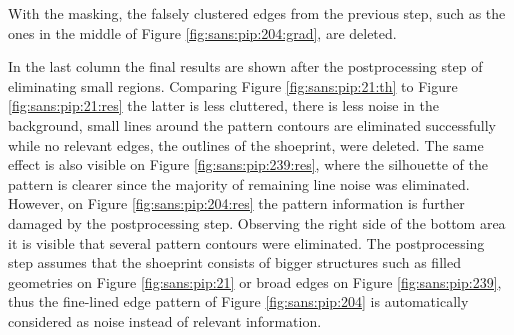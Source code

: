 \documentclass[draft,final]{vutinfth} %
\begin{document}
With the masking, the falsely clustered edges from the previous step, such as the ones in the middle of Figure \ref{fig:sans:pip:204:grad}, are deleted.
\par
In the last column the final results are shown after the postprocessing step of eliminating small regions.
Comparing Figure \ref{fig:sans:pip:21:th} to  Figure \ref{fig:sans:pip:21:res} the latter is less cluttered, there is less noise in the background, small lines around the pattern contours are eliminated successfully while no relevant edges, the outlines of the shoeprint, were deleted.
The same effect is also visible on Figure \ref{fig:sans:pip:239:res}, where the silhouette of the pattern is clearer since the majority of remaining line noise was eliminated.
However, on Figure \ref{fig:sans:pip:204:res} the pattern information is further damaged by the postprocessing step.
Observing the right side of the bottom area it is visible that several pattern contours were eliminated.
The postprocessing step assumes that the shoeprint consists of bigger structures such as filled geometries on Figure \ref{fig:sans:pip:21} or broad edges on Figure \ref{fig:sans:pip:239}, thus the fine-lined edge pattern of Figure \ref{fig:sans:pip:204} is automatically considered as noise instead of relevant information.
\end{document}
